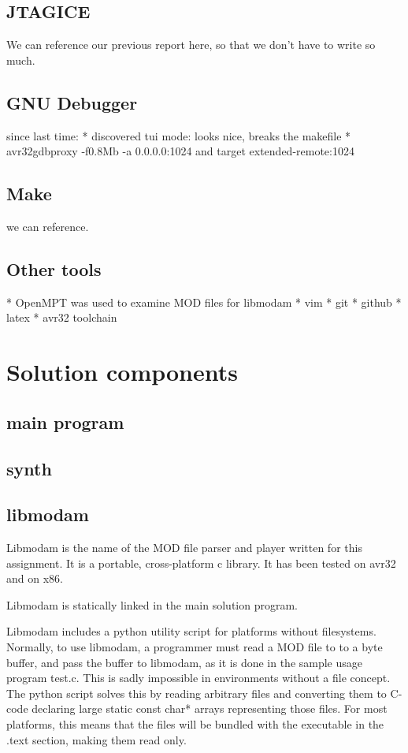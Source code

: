 \subsection{JTAGICE}
We can reference our previous report here, so that we don't have to write so much.

\subsection{GNU Debugger}
since last time:
* discovered tui mode: looks nice, breaks the makefile
* avr32gdbproxy -f0.8Mb -a 0.0.0.0:1024 and target extended-remote:1024

\subsection{Make}
we can reference.

\subsection{Other tools}
* OpenMPT was used to examine MOD files for libmodam
* vim
* git
* github
* latex
* avr32 toolchain


\section{Solution components}

\subsection{main program}
\subsection{synth}

\subsection{libmodam}

Libmodam is the name of the MOD file parser and player written for this assignment.
It is a portable, cross-platform c library.
It has been tested on avr32 and on x86.

Libmodam is statically linked in the main solution program.

Libmodam includes a python utility script for platforms without filesystems.
Normally, to use libmodam, a programmer must read a MOD file to to a byte buffer, and pass the buffer to libmodam, as it is done in the sample usage program test.c.
This is sadly impossible in environments without a file concept.
The python script solves this by reading arbitrary files and converting them to C-code declaring large static const char* arrays representing those files.
For most platforms, this means that the files will be bundled with the executable in the .text section, making them read only.

